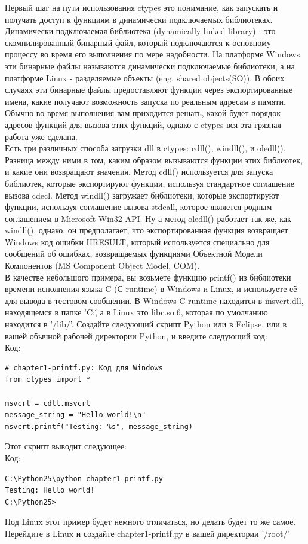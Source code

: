 \documentclass[12pt, a4paper, oneside]{book}
\begin{document}
Первый шаг на пути использования ctypes это понимание, как запускать и получать доступ к функциям в динамически подключаемых библиотеках. Динамически подключаемая библиотека (dynamically linked library) - это скомпилированный бинарный файл, который подключаются к основному процессу во время его выполнения по мере надобности. На платформе Windows эти бинарные файлы называются динамически подключаемые библиотеки, а на платформе Linux - разделяемые объекты (eng. shared objects(SO)). В обоих случаях эти бинарные файлы предоставляют функции через экспортированные имена, какие получают возможность запуска по реальным адресам в памяти. Обычно во время выполнения вам приходится решать, какой будет порядок адресов функций для вызова этих функций, однако с ctypes вся эта грязная работа уже сделана.\\

Есть три различных способа загрузки dll в ctypes: cdll(), windll(), и oledll(). Разница между ними в том, каким образом вызываются функции этих библиотек, и какие они возвращают значения. Метод cdll() используется для запуска библиотек, которые экспортируют функции, используя стандартное соглашение вызова cdecl. Метод windll() загружает библиотеки, которые экспортируют функции, используя соглашение вызова stdcall, которое является родным соглашением в Microsoft Win32 API. Ну а метод oledll() работает так же, как windll(), однако, он предполагает, что экспортированная функция возвращает Windows код ошибки HRESULT, который используется специально для сообщений об ошибках, возвращаемых функциями Объектной Модели Компонентов (MS Component Object Model, COM).\\

В качестве небольшого примера, вы возьмете функцию printf() из библиотеки времени исполнения языка C (С runtime) в Windows и Linux, и используете её для вывода в тестовом сообщении. В Windows C runtime находится в msvcrt.dll, находящемся в папке 'C:\WINDOWS{}\', а в Linux это libc.so.6, которая по умолчанию находится в '/lib/'. Создайте следующий скрипт Python или в Eclipse, или в вашей обычной рабочей директории Python, и введите следующий код:\\
Код:
\begin{verbatim}
# chapter1-printf.py: Код для Windows
from ctypes import *

msvcrt = cdll.msvcrt
message_string = "Hello world!\n"
msvcrt.printf("Testing: %s", message_string)
\end{verbatim}
Этот скрипт выводит следующее:\\
Код:
\begin{verbatim}
C:\Python25\python chapter1-printf.py
Testing: Hello world!
C:\Python25>
\end{verbatim}
Под Linux этот пример будет немного отличаться, но делать будет то же самое. Перейдите в Linux и создайте chapter1-printf.py в вашей директории '/root/'
\end{document}
